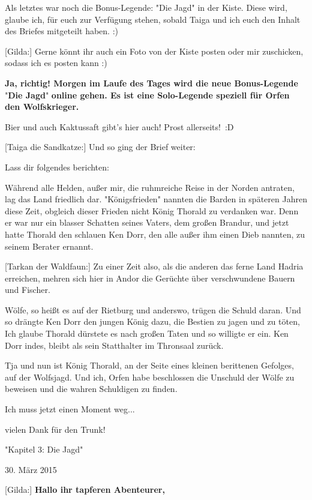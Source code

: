 \documentclass[10pt, a4paper, oneside]{book}
\begin{document}
\begin{multicols}{2}
Als letztes war noch die Bonus-Legende: "Die Jagd" in der Kiste. Diese wird, glaube ich, für euch zur Verfügung stehen, sobald Taiga und ich euch den Inhalt des Briefes mitgeteilt haben. :)

[Gilda:] Gerne könnt ihr auch ein Foto von der Kiste posten oder mir zuschicken, sodass ich es posten kann :)

\textbf{Ja, richtig! Morgen im Laufe des Tages wird die neue Bonus-Legende} "\textbf{Die Jagd}" \textbf{online gehen. Es ist eine Solo-Legende speziell für Orfen den Wolfskrieger.}


Bier und auch Kaktussaft gibt's hier auch! Prost allerseits! :D

[Taiga die Sandkatze:] Und so ging der Brief weiter:

Lass dir folgendes berichten:

Während alle Helden, außer mir, die ruhmreiche Reise in der Norden antraten, lag das Land friedlich dar. "Königsfrieden" nannten die Barden in späteren Jahren diese Zeit, obgleich dieser Frieden nicht König Thorald zu verdanken war. Denn er war nur ein blasser Schatten seines Vaters, dem großen Brandur, und jetzt hatte Thorald den schlauen Ken Dorr, den alle außer ihm einen Dieb nannten, zu seinem Berater ernannt.

[Tarkan der Waldfaun:] Zu einer Zeit also, als die anderen das ferne Land Hadria erreichen, mehren sich hier in Andor die Gerüchte über verschwundene Bauern und Fischer.

Wölfe, so heißt es auf der Rietburg und anderswo, trügen die Schuld daran. Und so drängte Ken Dorr den jungen König dazu, die Bestien zu jagen und zu töten, Ich glaube Thorald dürstete es nach großen Taten und so willigte er ein. Ken Dorr indes, bleibt als sein Statthalter im Thronsaal zurück.

Tja und nun ist König Thorald, an der Seite eines kleinen berittenen Gefolges, auf der Wolfsjagd. Und ich, Orfen habe beschlossen die Unschuld der Wölfe zu beweisen und die wahren Schuldigen zu finden.

Ich muss jetzt einen Moment weg...

vielen Dank für den Trunk!



\begin{center}
    "Kapitel 3: Die Jagd"
    
    30. März 2015
\end{center}


[Gilda:] \textbf{Hallo ihr tapferen Abenteurer,}


\end{multicols}
\end{document}
